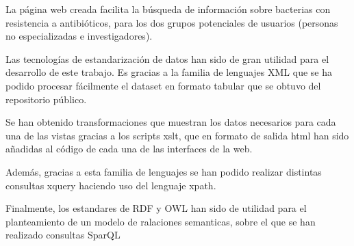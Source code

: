\documentclass[../main.tex]{subfiles}
\begin{document}
La página web creada facilita la búsqueda de información sobre bacterias con resistencia a antibióticos, para los dos grupos potenciales de usuarios (personas no especializadas e investigadores).

Las tecnologías de estandarización de datos han sido de gran utilidad para el desarrollo de este trabajo. Es gracias a la familia de lenguajes XML que se ha podido procesar fácilmente el dataset en formato tabular que se obtuvo del repositorio público. 

Se han obtenido transformaciones que muestran los datos necesarios para cada una de las vistas gracias a los scripts xslt, que en formato de salida html han sido añadidas al código de cada una de las interfaces de la web.

Además, gracias a esta familia de lenguajes se han podido realizar distintas consultas xquery haciendo uso del lenguaje xpath.

\hfill

Finalmente, los estandares de RDF y OWL han sido de utilidad para el planteamiento de un modelo de ralaciones semanticas, sobre el que se han realizado consultas SparQL 

\hfill
\end{document}
